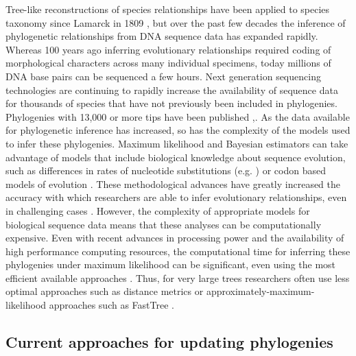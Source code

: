 \documentclass[10pt]{article}
\begin{document}
Tree-like reconstructions of species relationships have been applied to species taxonomy since Lamarck in 1809 \cite{Lamarck_philosophie_1873}, but over the past few decades the inference of phylogenetic relationships from DNA sequence data has expanded rapidly. 
Whereas 100 years ago inferring evolutionary relationships required coding of morphological characters across many individual specimens, today millions of DNA base pairs can be sequenced a few hours. 
Next generation sequencing technologies are continuing to rapidly increase the availability of sequence data for thousands of species that have not previously been included in phylogenies. 
Phylogenies with 13,000 or more tips have been published \cite{smith_mega-phylogeny_2009},\cite{smith_understanding_2011}.
As the data available for phylogenetic inference has increased, so has the complexity of the models used to infer these phylogenies. 
Maximum likelihood and Bayesian estimators can take advantage of models that include biological knowledge about sequence evolution, such as differences in rates of nucleotide substitutions (e.g. \cite{Jukes_evolution_1969}) or codon based models of evolution \cite{shapiro_choosing_2006}. 
These methodological advances have greatly increased the accuracy with which researchers are able to infer evolutionary relationships, even in challenging cases \cite{kuhner_simulation_1994}. 
However, the complexity of appropriate models for biological sequence data means that these analyses can be computationally expensive. 
Even with recent advances in processing power and the availability of high performance computing resources, the computational time for inferring these phylogenies under maximum likelihood can be significant, even using the most efficient available approaches \cite{stamatakis_raxml-vi-hpc:_2006}.
Thus, for very large trees researchers often use less optimal approaches such as distance metrics or approximately-maximum-likelihood approaches such as FastTree \cite{price_fasttree:_2009, price_fasttree_2010}.


\subsection*{Current approaches for updating phylogenies}
\end{document}

